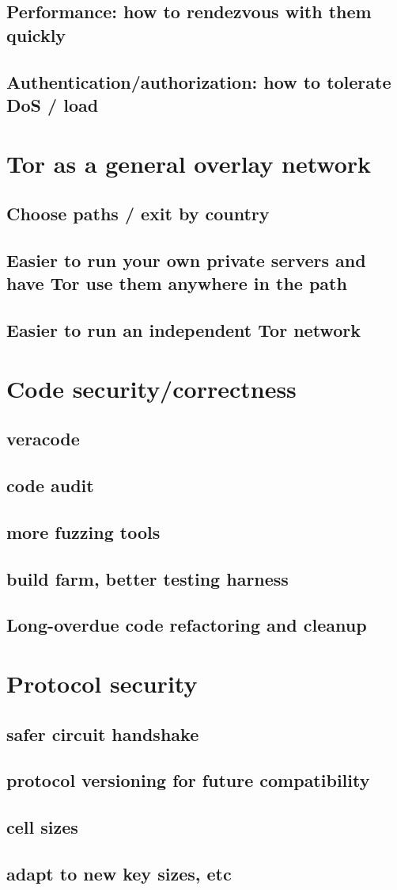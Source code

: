 \documentclass{article}
\begin{document}
\subsection{Performance: how to rendezvous with them quickly}
\subsection{Authentication/authorization: how to tolerate DoS / load}
\section{Tor as a general overlay network}
\subsection{Choose paths / exit by country}
\subsection{Easier to run your own private servers and have Tor use them
      anywhere in the path}
\subsection{Easier to run an independent Tor network}
\section{Code security/correctness}
\subsection{veracode}
\subsection{code audit}
\subsection{more fuzzing tools}
\subsection{build farm, better testing harness}
\subsection{Long-overdue code refactoring and cleanup}
\section{Protocol security}
\subsection{safer circuit handshake}
\subsection{protocol versioning for future compatibility}
\subsection{cell sizes}
\subsection{adapt to new key sizes, etc}

 
\end{document}
